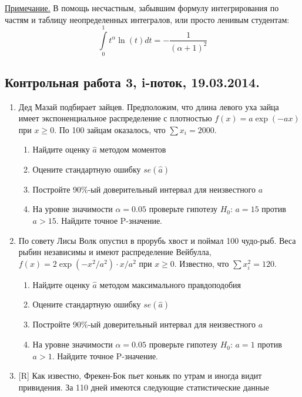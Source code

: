 \documentclass[12pt, a4paper]{article}\usepackage[]{graphicx}\usepackage[]{color}
\begin{document}
				\underline{Примечание.} В помощь несчастным, забывшим формулу интегрирования по частям и таблицу неопределенных интегралов, или просто ленивым студентам:
				$$
				\int\limits_{0}^1 t^\alpha \ln (t) dt = -\frac{1}{(\alpha+1)^2}
				$$



				\subsection{Контрольная работа 3, i-поток, 19.03.2014. }

				\begin{enumerate}
					\item Дед Мазай подбирает зайцев. Предположим, что длина левого уха зайца имеет экспоненциальное распределение с плотностью $f(x)=a\exp(-ax)$ при $x\geq 0$. По 100 зайцам оказалось, что $\sum x_i=2000$.
					\begin{enumerate}
						\item  Найдите оценку $\hat{a}$ методом моментов
						\item Оцените стандартную ошибку $se(\hat{a})$
						\item Постройте 90\%-ый доверительный интервал для неизвестного $a$
						\item На уровне значимости $\alpha=0.05$ проверьте гипотезу $H_0$: $a=15$ против $a>15$. Найдите точное P-значение.
					\end{enumerate}

					\item По совету Лисы Волк опустил в прорубь хвост и поймал 100 чудо-рыб. Веса рыбин независимы и имеют распределение Вейбулла, $f(x)=2\exp(-x^2/a^2)\cdot x/a^2$ при $x\geq 0$. Известно, что $\sum x_i^2=120$.
					\begin{enumerate}
						\item  Найдите оценку $\hat{a}$ методом максимального правдоподобия
						\item Оцените стандартную ошибку $se(\hat{a})$
						\item Постройте 90\%-ый доверительный интервал для неизвестного $a$
						\item На уровне значимости $\alpha=0.05$ проверьте гипотезу $H_0$: $a=1$ против $a>1$. Найдите точное P-значение.
					\end{enumerate}


					\item $[$R] Как известно, Фрекен-Бок пьет коньяк по утрам и иногда видит привидения. За 110 дней имеются следующие статистические данные



\end{enumerate}
\end{document}
